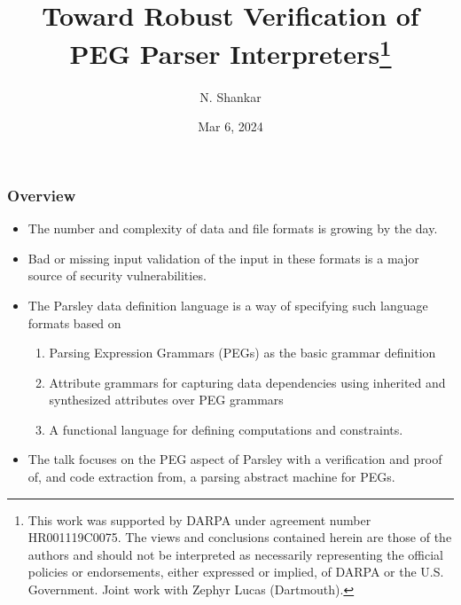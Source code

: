 \documentclass[xcolor=dvipsnames]{beamer}
\author[Natarajan Shankar]{N. Shankar}
\title[{\makebox[.45\paperwidth]{\greencol{Verifying PEG}

\hfill%
        \insertframenumber/\inserttotalframenumber}}]{{\textbf{Toward Robust Verification of PEG Parser Interpreters\footnote{  This work was supported by DARPA under agreement number
  HR001119C0075.  The views and conclusions contained herein are those
  of the authors and should not be interpreted as necessarily
  representing the official policies or endorsements, either expressed
  or implied, of DARPA or the U.S. Government.  Joint work with Zephyr Lucas (Dartmouth).
}}}
}
\institute{  Computer Science Laboratory\\
  SRI International\\
  Menlo Park, CA}
\date{Mar 6, 2024%
}
\begin{document}
\begin{frame}[plain]
\titlepage
\end{frame}

\begin{frame}[fragile]
\frametitle{Overview}
\begin{itemize}
\item The number and complexity of data and file formats is growing by the day.
\item Bad or missing input validation of the input in these formats is a major source of security vulnerabilities.
\item The Parsley data definition language is a way of specifying such language formats based on
\begin{enumerate}
\item Parsing Expression Grammars (PEGs) as the basic grammar definition
\item Attribute grammars for capturing data dependencies using inherited and synthesized attributes over PEG grammars
  \item A functional language for defining computations and constraints. 
\end{enumerate}
\item The talk focuses on the PEG aspect of Parsley with a verification and proof of, and code extraction from,
a parsing abstract machine for PEGs.
\end{itemize}
\end{frame}
\end{document}
